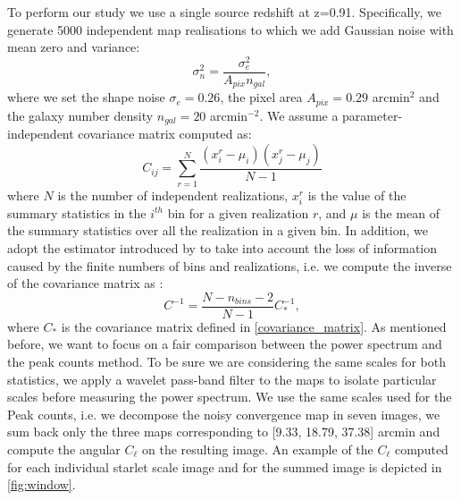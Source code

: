\documentclass{aa}
\begin{document}
To perform our study we use a single source redshift at z=0.91. Specifically, we generate 5000 independent map realisations to which we add Gaussian noise with mean zero and variance:
 \begin{equation}
     \sigma^2_n= \frac{\sigma_e^2}{A_{pix}n_{gal}},
 \end{equation}
where we set the shape noise $\sigma_e = 0.26$, the pixel area $A_{pix}=0.29$ arcmin$^2$ and the galaxy number density $n_{gal}=20$ arcmin$^{-2}$.  
We assume a parameter-independent covariance matrix computed as:
\begin{equation}\label{covariance_matrix}
    C_{ij}=\sum_{r=1}^N
    \frac{(x_i^r-\mu_i)(x_j^r-\mu_j)}{N-1}
\end{equation}
where $N$ is the number of independent realizations, $x_i^r$ is the value of the summary statistics in the $i^{th}$ bin for a given realization $r$, and $\mu$ is the mean of the summary statistics over all the realization in a given bin. 
In addition, we adopt the estimator introduced by \cite{hartlap2007your} to take into account the loss of information caused by the finite numbers of bins and realizations, i.e. we compute the inverse of the covariance matrix as :
\begin{equation}
    C^{-1}=\frac{N-n_{bins}-2}{N-1}C_{*}^{-1},
\end{equation}
where $C_{*}$ is the covariance matrix defined in \autoref{covariance_matrix}. 
As mentioned before, we want to focus on a fair comparison between the power spectrum and the peak counts method. To be sure we are considering the same scales for both statistics, we apply a wavelet pass-band filter to the maps to isolate particular scales before measuring the power spectrum.  We use the same scales used for the Peak counts, i.e. we decompose the noisy convergence map in seven images, we sum back only the three maps corresponding to [9.33, 18.79, 37.38] arcmin and compute the angular $C_{\ell}$ on the resulting image.
An example of the $C_{\ell}$ computed for each individual starlet scale image and for the summed image is depicted in \autoref{fig:window}.
\end{document}
